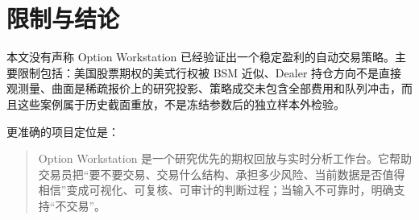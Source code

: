 \documentclass[UTF8,a4paper,11pt]{ctexart}
\begin{document}
\section{限制与结论}

本文没有声称 Option Workstation 已经验证出一个稳定盈利的自动交易策略。主要限制包括：美国股票期权的美式行权被 BSM 近似、Dealer 持仓方向不是直接观测量、曲面是稀疏报价上的研究投影、策略成交未包含全部费用和队列冲击，而且这些案例属于历史截面重放，不是冻结参数后的独立样本外检验。

更准确的项目定位是：

\begin{quote}
Option Workstation 是一个研究优先的期权回放与实时分析工作台。它帮助交易员把“要不要交易、交易什么结构、承担多少风险、当前数据是否值得相信”变成可视化、可复核、可审计的判断过程；当输入不可靠时，明确支持“不交易”。
\end{quote}
\end{document}
